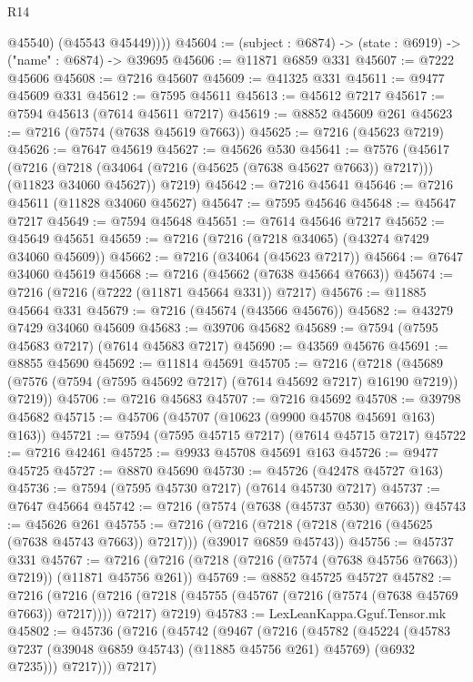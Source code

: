 \begin{lexlean}{R14}
\begin{coremodule}
            @45540)
          (@45543 @45449))))
@45604 := (subject : @6874) -> (state : @6919) -> ("name" : @6874) -> @39695
@45606 := @11871 @6859 @331
@45607 := @7222 @45606
@45608 := @7216 @45607
@45609 := @41325 @331
@45611 := @9477 @45609 @331
@45612 := @7595 @45611
@45613 := @45612 @7217
@45617 := @7594 @45613 (@7614 @45611 @7217)
@45619 := @8852 @45609 @261
@45623 := @7216 (@7574 (@7638 @45619 @7663))
@45625 := @7216 (@45623 @7219)
@45626 := @7647 @45619
@45627 := @45626 @530
@45641 := @7576
    (@45617
      (@7216 (@7218 (@34064 (@7216 (@45625 (@7638 @45627 @7663)) @7217))) (@11823 @34060 @45627))
      @7219)
@45642 := @7216 @45641
@45646 := @7216 @45611 (@11828 @34060 @45627)
@45647 := @7595 @45646
@45648 := @45647 @7217
@45649 := @7594 @45648
@45651 := @7614 @45646 @7217
@45652 := @45649 @45651
@45659 := @7216 (@7216 (@7218 @34065) (@43274 @7429 @34060 @45609))
@45662 := @7216 (@34064 (@45623 @7217))
@45664 := @7647 @34060 @45619
@45668 := @7216 (@45662 (@7638 @45664 @7663))
@45674 := @7216 (@7216 (@7222 (@11871 @45664 @331)) @7217)
@45676 := @11885 @45664 @331
@45679 := @7216 (@45674 (@43566 @45676))
@45682 := @43279 @7429 @34060 @45609
@45683 := @39706 @45682
@45689 := @7594 (@7595 @45683 @7217) (@7614 @45683 @7217)
@45690 := @43569 @45676
@45691 := @8855 @45690
@45692 := @11814 @45691
@45705 := @7216
    (@7218 (@45689 (@7576 (@7594 (@7595 @45692 @7217) (@7614 @45692 @7217) @16190 @7219)) @7219))
@45706 := @7216 @45683
@45707 := @7216 @45692
@45708 := @39798 @45682
@45715 := @45706 (@45707 (@10623 (@9900 @45708 @45691 @163) @163))
@45721 := @7594 (@7595 @45715 @7217) (@7614 @45715 @7217)
@45722 := @7216 @42461
@45725 := @9933 @45708 @45691 @163
@45726 := @9477 @45725
@45727 := @8870 @45690
@45730 := @45726 (@42478 @45727 @163)
@45736 := @7594 (@7595 @45730 @7217) (@7614 @45730 @7217)
@45737 := @7647 @45664
@45742 := @7216 (@7574 (@7638 (@45737 @530) @7663))
@45743 := @45626 @261
@45755 := @7216
    (@7216 (@7218 (@7218 (@7216 (@45625 (@7638 @45743 @7663)) @7217))) (@39017 @6859 @45743))
@45756 := @45737 @331
@45767 := @7216 (@7216 (@7218 (@7216 (@7574 (@7638 @45756 @7663)) @7219)) (@11871 @45756 @261))
@45769 := @8852 @45725 @45727
@45782 := @7216
    (@7216 (@7216 (@7218 (@45755 (@45767 (@7216 (@7574 (@7638 @45769 @7663)) @7217)))) @7217) @7219)
@45783 := LexLeanKappa.Gguf.Tensor.mk
@45802 := @45736
    (@7216
      (@45742
        (@9467
          (@7216
            (@45782
              (@45224
                (@45783 @7237 (@39048 @6859 @45743) (@11885 @45756 @261) @45769)
                (@6932 @7235)))
            @7217)))
      @7217)

\end{coremodule}
\end{lexlean}
